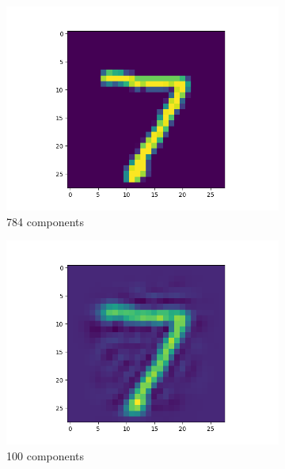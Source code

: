 \begin{figure}
  \centering
  \begin{subfigure}{0.3\linewidth}
    \includegraphics[width=\linewidth]{filtered-input-pca-784-components.png}
    \caption{784 components}
  \end{subfigure}
  \begin{subfigure}{0.3\linewidth}
    \includegraphics[width=\linewidth]{filtered-input-pca-100-components.png}
    \caption{100 components}
  \end{subfigure}
  \begin{subfigure}{0.3\linewidth}

\end{subfigure}
\end{figure}
